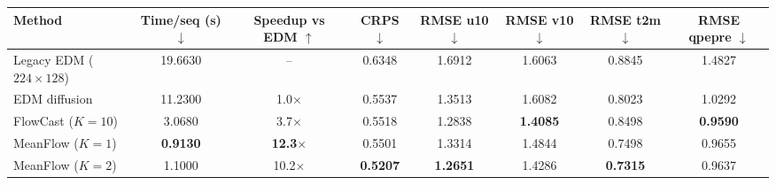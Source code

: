 \documentclass[border=10pt]{standalone}
\begin{document}
\begin{tabular}{lccccccc}
\toprule
Method & Time/seq (s) $\downarrow$ & Speedup vs EDM $\uparrow$ & CRPS $\downarrow$ & RMSE u10 $\downarrow$ & RMSE v10 $\downarrow$ & RMSE t2m $\downarrow$ & RMSE qpepre $\downarrow$ \\
\midrule
Legacy EDM ($224{\times}128$) & 19.6630 & -- & 0.6348 & 1.6912 & 1.6063 & 0.8845 & 1.4827 \\
EDM diffusion & 11.2300 & 1.0$\times$ & 0.5537 & 1.3513 & 1.6082 & 0.8023 & 1.0292 \\
FlowCast ($K{=}10$) & 3.0680 & 3.7$\times$ & 0.5518 & 1.2838 & \textbf{1.4085} & 0.8498 & \textbf{0.9590} \\
MeanFlow ($K{=}1$) & \textbf{0.9130} & \textbf{12.3$\times$} & 0.5501 & 1.3314 & 1.4844 & 0.7498 & 0.9655 \\
MeanFlow ($K{=}2$) & 1.1000 & 10.2$\times$ & \textbf{0.5207} & \textbf{1.2651} & 1.4286 & \textbf{0.7315} & 0.9637 \\
\bottomrule
\end{tabular}
\end{document}

